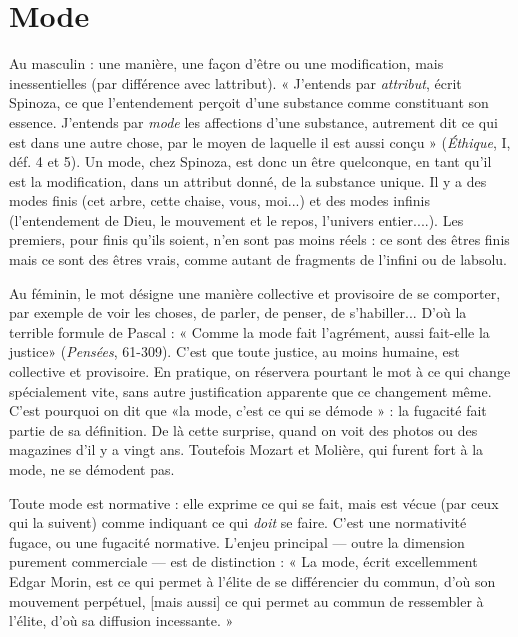 \section{Mode}
Au masculin : une manière, une façon d’être ou une modification,
mais inessentielles (par différence avec lattribut). « J'entends par
{\it attribut}, écrit Spinoza, ce que l’entendement perçoit d’une substance comme
constituant son essence. J'entends par {\it mode} les affections d’une substance,
autrement dit ce qui est dans une autre chose, par le moyen de laquelle il est
aussi conçu » ({\it Éthique}, I, déf. 4 et 5). Un mode, chez Spinoza, est donc un être
quelconque, en tant qu’il est la modification, dans un attribut donné, de la
substance unique. Il y a des modes finis (cet arbre, cette chaise, vous, moi...) et
des modes infinis (l’entendement de Dieu, le mouvement et le repos, l'univers
entier....). Les premiers, pour finis qu’ils soient, n’en sont pas moins réels : ce
sont des êtres finis mais ce sont des êtres vrais, comme autant de fragments de
l'infini ou de labsolu.

Au féminin, le mot désigne une manière collective et provisoire de se comporter,
par exemple de voir les choses, de parler, de penser, de s’habiller...
D'où la terrible formule de Pascal : « Comme la mode fait l’agrément, aussi
fait-elle la justice» ({\it Pensées}, 61-309). C’est que toute justice, au moins
humaine, est collective et provisoire. En pratique, on réservera pourtant le mot
à ce qui change spécialement vite, sans autre justification apparente que ce
changement même. C’est pourquoi on dit que «la mode, c’est ce qui se
démode » : la fugacité fait partie de sa définition. De là cette surprise, quand on
voit des photos ou des magazines d'il y a vingt ans. Toutefois Mozart et
Molière, qui furent fort à la mode, ne se démodent pas.

Toute mode est normative : elle exprime ce qui se fait, mais est vécue (par
ceux qui la suivent) comme indiquant ce qui {\it doit} se faire. C’est une normativité
fugace, ou une fugacité normative. L'enjeu principal — outre la dimension
purement commerciale — est de distinction : « La mode, écrit excellemment
Edgar Morin, est ce qui permet à l'élite de se différencier du commun, d’où son
mouvement perpétuel, [mais aussi] ce qui permet au commun de ressembler à
l'élite, d’où sa diffusion incessante. »

